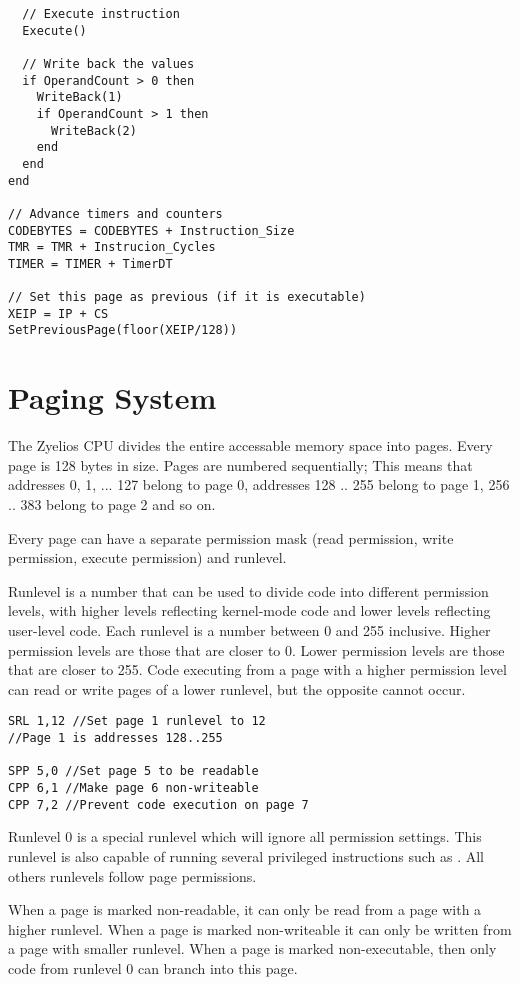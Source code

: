 \begin{verbatim}
  // Execute instruction
  Execute()

  // Write back the values
  if OperandCount > 0 then
    WriteBack(1)
    if OperandCount > 1 then
      WriteBack(2)
    end
  end
end

// Advance timers and counters
CODEBYTES = CODEBYTES + Instruction_Size
TMR = TMR + Instrucion_Cycles
TIMER = TIMER + TimerDT

// Set this page as previous (if it is executable)
XEIP = IP + CS
SetPreviousPage(floor(XEIP/128))  
\end{verbatim}
\onehalfspacing

\section{Paging System} \label{paging}
The Zyelios CPU divides the entire accessable memory space into pages. Every page is 128 bytes in size. Pages are numbered sequentially; This means that addresses 0, 1, ... 127 belong to page 0, addresses 128 .. 255 belong to page 1, 256 .. 383 belong to page 2 and so on.

Every page can have a separate permission mask (read permission, write permission, execute permission) and runlevel.

Runlevel is a number that can be used to divide code into different permission levels, with higher levels reflecting kernel-mode code and lower levels reflecting user-level code. Each runlevel is a number between 0 and 255 inclusive. Higher permission levels are those that are closer to 0. Lower permission levels are those that are closer to 255. Code executing from a page with a higher permission level can read or write pages of a lower runlevel, but the opposite cannot occur.

\begin{verbatim}
SRL 1,12 //Set page 1 runlevel to 12
//Page 1 is addresses 128..255

SPP 5,0 //Set page 5 to be readable
CPP 6,1 //Make page 6 non-writeable
CPP 7,2 //Prevent code execution on page 7
\end{verbatim}

Runlevel 0 is a special runlevel which will ignore all permission settings. This runlevel is also capable of running several privileged instructions such as . All others runlevels follow page permissions.

When a page is marked non-readable, it can only be read from a page with a higher runlevel. When a page is marked non-writeable it can only be written from a page with smaller runlevel. When a page is marked non-executable, then only code from runlevel 0 can branch into this page.

